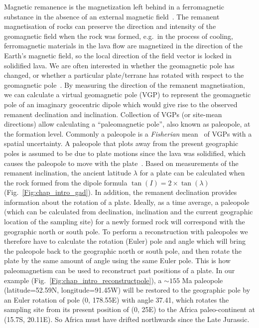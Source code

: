 Magnetic remanence is the magnetization left behind in a ferromagnetic substance
in the absence of an external magnetic field~\citep{T20}. The remanent
magnetisation of rocks can preserve the direction and intensity of the
geomagnetic field when the rock was formed, e.g.\ in the process of cooling,
ferromagnetic materials in the lava flow are magnetized in the direction of the
Earth's magnetic field, so the local direction of the field vector is locked in
solidified lava. We are often interested in whether the geomagnetic pole has
changed, or whether a particular plate/terrane has rotated with respect to the
geomagnetic pole~\citep{T20}. By measuring the direction of the remanent
magnetisation, we can calculate a virtual geomagnetic pole (VGP) to represent
the geomagnetic pole of an imaginary geocentric dipole which would give rise to
the observed remanent declination and inclination. Collection of VGPs (or
site-mean directions) allow calculating a ``paleomagnetic pole'', also known as
paleopole, at the formation level. Commonly a paleopole is a \emph{Fisherian}
mean~\citep{F53} of VGPs with a spatial uncertainty. A paleopole that plots away
from the present geographic poles is assumed to be due to plate motions since
the lava was solidified, which causes the paleopole to move with the
plate~\citep{T08}. Based on measurements of the remanent inclination, the
ancient latitude $\lambda$ for a plate can be calculated when the rock formed
from the dipole formula $\tan(I) = 2 \times\tan(\lambda)$
(Fig.~\ref{Fig:chap_intro_gad}). In addition, the remanent declination provides
information about the rotation of a plate. Ideally, as a time average, a
paleopole (which can be calculated from declination, inclination and the current
geographic location of the sampling site) for a newly formed rock will
correspond with the geographic north or south pole. To perform a reconstruction
with paleopoles we therefore have to calculate the rotation (Euler) pole and
angle which will bring the paleopole back to the geographic north or south pole,
and then rotate the plate by the same amount of angle using the same Euler pole.
This is how paleomagnetism can be used to reconstruct past positions of a plate.
In our example (Fig.~\ref{Fig:chap_intro_reconstructpole}), a ${\sim}155$ Ma
paleopole (latitude=52.59\degree{}N, longitude=91.45\degree{}W) will be restored
to the geographic pole by an Euler rotation of pole (0\degree, 178.55\degree{}E)
with angle 37.41\degree, which rotates the sampling site from its present
position of (0\degree, 25\degree{}E) to the Africa paleo-continent at
(15.7\degree{}S, 20.11\degree{}E). So Africa must have drifted northwards since
the Late Jurassic.

